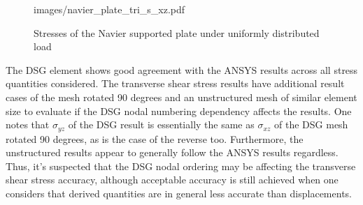\begin{figure}[h!]
{		{images/navier_plate_tri_s_xz.pdf}}
	\\
	\caption{\label{Navier_tri_s_xx_yy}Stresses of the Navier supported plate under uniformly distributed load}
\end{figure}

The DSG element shows good agreement with the ANSYS results across all stress quantities considered. The transverse shear stress results have additional result cases of the mesh rotated 90 degrees and an unstructured mesh of similar element size to evaluate if the DSG nodal numbering dependency affects the results. One notes that $\sigma_{yz}$ of the DSG result is essentially the same as $\sigma_{xz}$ of the DSG mesh rotated 90 degrees, as is the case of the reverse too. Furthermore, the unstructured results appear to generally follow the ANSYS results regardless. Thus, it's suspected that the DSG nodal ordering may be affecting the transverse shear stress accuracy, although acceptable accuracy is still achieved when one considers that derived quantities are in general less accurate than displacements.

